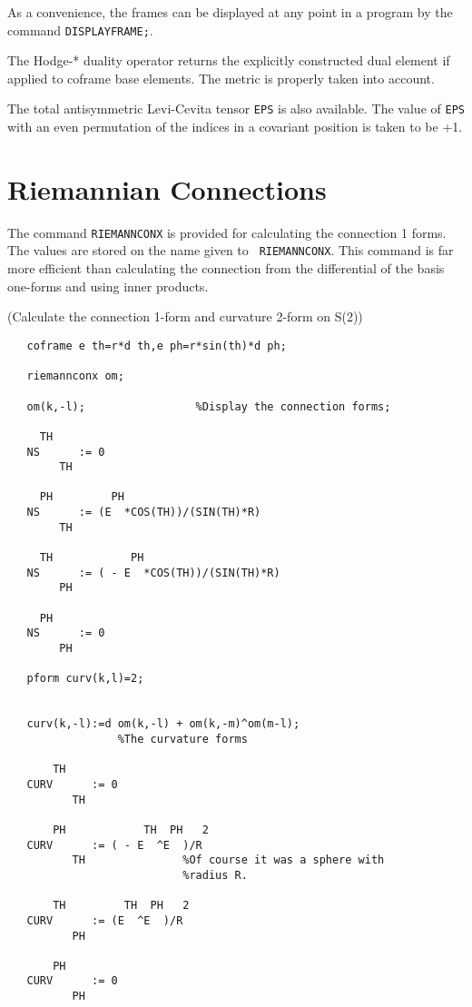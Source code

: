  
As a convenience, the frames can be displayed at any point in a program
by the command {\tt DISPLAYFRAME;}\label{DISPLAYFRAME}.

The Hodge-* duality operator returns the explicitly constructed dual
element if applied to coframe base elements. The metric is properly
taken into account.

 
The total antisymmetric Levi-Cevita tensor {\tt EPS}\label{EPS} is
also available.  The value of {\tt EPS} with an even permutation of the
indices in a covariant position is taken to be +1.


\section{Riemannian Connections}

The command {\tt RIEMANNCONX} is provided for calculating the
 \label{RIEMANNCONX}
connection 1 forms.  The values are stored on the name given to {\tt
RIEMANNCONX}.  This command is far more efficient than calculating the
connection from the differential of the basis one-forms and using
inner products.

\example (Calculate the connection 1-form and curvature 2-form on S(2))

\begin{verbatim}
   coframe e th=r*d th,e ph=r*sin(th)*d ph;

   riemannconx om;

   om(k,-l);                 %Display the connection forms;

     TH
   NS      := 0
        TH

     PH         PH
   NS      := (E  *COS(TH))/(SIN(TH)*R)
        TH

     TH            PH
   NS      := ( - E  *COS(TH))/(SIN(TH)*R)
        PH

     PH
   NS      := 0
        PH

   pform curv(k,l)=2;


   curv(k,-l):=d om(k,-l) + om(k,-m)^om(m-l);
                 %The curvature forms

       TH
   CURV      := 0
          TH

       PH            TH  PH   2
   CURV      := ( - E  ^E  )/R
          TH               %Of course it was a sphere with
                           %radius R.

       TH         TH  PH   2
   CURV      := (E  ^E  )/R
          PH

       PH
   CURV      := 0
          PH
\end{verbatim}

